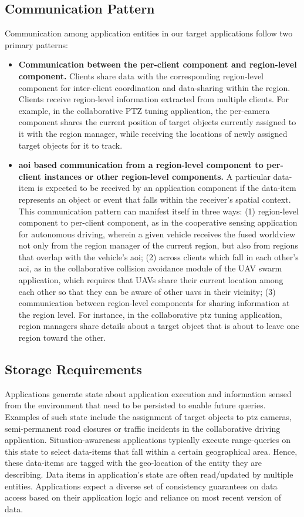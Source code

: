 \subsection{Communication Pattern}
\label{sec:app_model_comm}
Communication among application entities in our target applications follow two primary patterns:
\begin{itemize}
\item \textbf{Communication between the per-client component and region-level component.} Clients share data with the corresponding region-level component for inter-client coordination and data-sharing within the region. Clients receive region-level information extracted from multiple clients. For example, in the collaborative PTZ tuning application, the per-camera component shares the current position of target objects currently assigned to it with the region manager, while receiving the locations of newly assigned target objects for it to track.
\item \textbf{\gls{aoi} based communication from a region-level component to per-client instances or other region-level components.} A particular data-item is expected to be received by an application component if the data-item represents an object or event that falls within the receiver's spatial context. This communication pattern can manifest itself in three ways: (1) region-level component to per-client component, as in the cooperative sensing application for autonomous driving, wherein a given vehicle receives the fused worldview not only from the region manager of the current region, but also from regions that overlap with the vehicle's \gls{aoi}; (2) across clients which fall in each other's \gls{aoi}, as in the collaborative collision avoidance module of the UAV swarm application, which requires that UAVs share their current location among each other so that they can be aware of other \glspl{uav} in their vicinity; (3) communication between region-level components for sharing information at the region level. For instance, in the collaborative \gls{ptz} tuning application, region managers share details about a target object that is about to leave one region toward the other.
\end{itemize}
\subsection{Storage Requirements}
Applications generate state about application execution and information sensed from the environment that need to be persisted to enable future queries. Examples of such state include the assignment of target objects to \gls{ptz} cameras, semi-permanent road closures or traffic incidents in the collaborative driving application. Situation-awareness applications typically execute range-queries on this state to select data-items that fall within a certain geographical area. Hence, these data-items are tagged with the geo-location of the entity they are describing. Data items in application's state are often read/updated by multiple entities. Applications expect a diverse set of  consistency guarantees on data access based on their application logic and reliance on most recent version of data.

